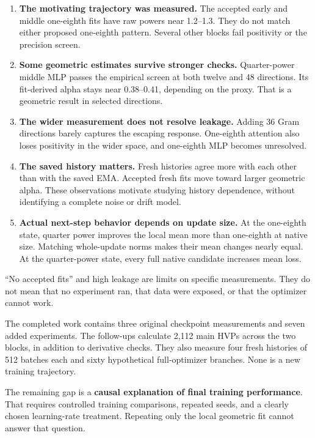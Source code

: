 \documentclass[
  14pt,
  letterpaper,
]{extarticle}
\providecommand{\tightlist}{%
  \setlength{\itemsep}{0pt}\setlength{\parskip}{0pt}}
\begin{document}
\begin{enumerate}
\def\labelenumi{\arabic{enumi}.}
\tightlist
\item
  \textbf{The motivating trajectory was measured.} The accepted early
  and middle one-eighth fits have raw powers near 1.2--1.3. They do not
  match either proposed one-eighth pattern. Several other blocks fail
  positivity or the precision screen.
\item
  \textbf{Some geometric estimates survive stronger checks.}
  Quarter-power middle MLP passes the empirical screen at both twelve
  and 48 directions. Its fit-derived alpha stays near 0.38--0.41,
  depending on the proxy. That is a geometric result in selected
  directions.
\item
  \textbf{The wider measurement does not resolve leakage.} Adding 36
  Gram directions barely captures the escaping response. One-eighth
  attention also loses positivity in the wider space, and one-eighth MLP
  becomes unresolved.
\item
  \textbf{The saved history matters.} Fresh histories agree more with
  each other than with the saved EMA. Accepted fresh fits move toward
  larger geometric alpha. These observations motivate studying history
  dependence, without identifying a complete noise or drift model.
\item
  \textbf{Actual next-step behavior depends on update size.} At the
  one-eighth state, quarter power improves the local mean more than
  one-eighth at native size. Matching whole-update norms makes their
  mean changes nearly equal. At the quarter-power state, every full
  native candidate increases mean loss.
\end{enumerate}

``No accepted fits'' and high leakage are limits on specific
measurements. They do not mean that no experiment ran, that data were
exposed, or that the optimizer cannot work.

The completed work contains three original checkpoint measurements and
seven added experiments. The follow-ups calculate 2,112 main HVPs across
the two blocks, in addition to derivative checks. They also measure four
fresh histories of 512 batches each and sixty hypothetical
full-optimizer branches. None is a new training trajectory.

The remaining gap is a \textbf{causal explanation of final training
performance}. That requires controlled training comparisons, repeated
seeds, and a clearly chosen learning-rate treatment. Repeating only the
local geometric fit cannot answer that question.
\end{document}
